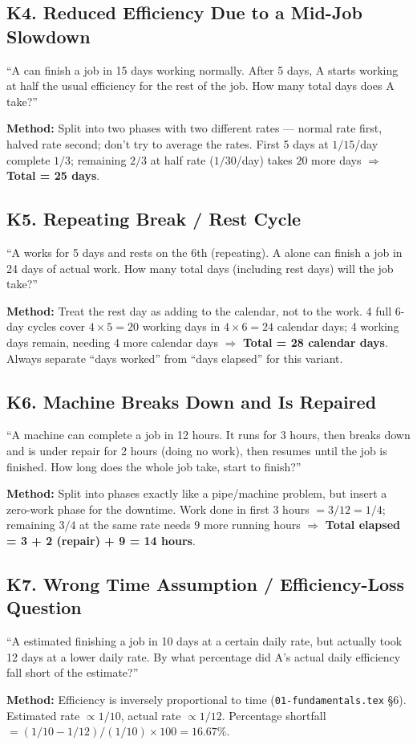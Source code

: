 \documentclass[11pt]{article}
\begin{document}
\subsection*{K4. Reduced Efficiency Due to a Mid-Job Slowdown}
\begin{tipbox}[Phrasing]
``A can finish a job in 15 days working normally. After 5 days, A starts working at half the usual
efficiency for the rest of the job. How many total days does A take?''
\end{tipbox}
\textbf{Method:} Split into two phases with two different rates --- normal rate first, halved rate
second; don't try to average the rates. First 5 days at $1/15$/day complete $1/3$; remaining $2/3$ at
half rate ($1/30$/day) takes $20$ more days $\Rightarrow$ \textbf{Total = 25 days}.

\subsection*{K5. Repeating Break / Rest Cycle}
\begin{tipbox}[Phrasing]
``A works for 5 days and rests on the 6th (repeating). A alone can finish a job in 24 days of actual
work. How many total days (including rest days) will the job take?''
\end{tipbox}
\textbf{Method:} Treat the rest day as adding to the calendar, not to the work. 4 full 6-day cycles
cover $4\times5=20$ working days in $4\times6=24$ calendar days; 4 working days remain, needing 4 more
calendar days $\Rightarrow$ \textbf{Total = 28 calendar days}. Always separate ``days worked'' from
``days elapsed'' for this variant.

\subsection*{K6. Machine Breaks Down and Is Repaired}
\begin{tipbox}[Phrasing]
``A machine can complete a job in 12 hours. It runs for 3 hours, then breaks down and is under repair
for 2 hours (doing no work), then resumes until the job is finished. How long does the whole job
take, start to finish?''
\end{tipbox}
\textbf{Method:} Split into phases exactly like a pipe/machine problem, but insert a zero-work phase
for the downtime. Work done in first 3 hours $=3/12=1/4$; remaining $3/4$ at the same rate needs $9$
more running hours $\Rightarrow$ \textbf{Total elapsed = 3 + 2 (repair) + 9 = 14 hours}.

\subsection*{K7. Wrong Time Assumption / Efficiency-Loss Question}
\begin{tipbox}[Phrasing]
``A estimated finishing a job in 10 days at a certain daily rate, but actually took 12 days at a
lower daily rate. By what percentage did A's actual daily efficiency fall short of the estimate?''
\end{tipbox}
\textbf{Method:} Efficiency is inversely proportional to time (\texttt{01-fundamentals.tex} \S6).
Estimated rate $\propto 1/10$, actual rate $\propto 1/12$. Percentage shortfall
$=(1/10-1/12)/(1/10)\times100=16.67\%$.
\end{document}
